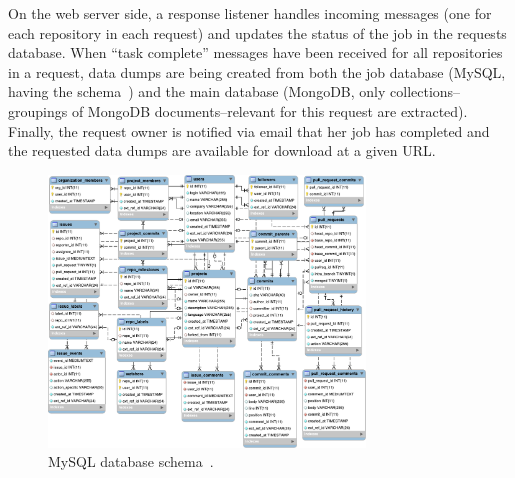 On the web server side, a response listener handles incoming messages (one for each repository
in each request)  and updates the status of the job in the requests database.
When ``task complete'' messages have been received for all repositories in a request, data dumps
are being created from both the job database (MySQL, having the \ght schema~\cite{gousios2013ghtorent})
and the main \ght database (MongoDB, only collections--groupings of MongoDB documents--relevant for this
request are extracted).
%
Finally, the request owner is notified via email that her job has completed and the requested data dumps
are available for download at a given URL.

\begin{figure}[t]
\begin{center}
\includegraphics[width=0.75\textwidth]{figures/schema.pdf}
\caption{MySQL database schema~\cite{gousios2013ghtorent}.}
\label{fig:schema}
\end{center}
\end{figure}

